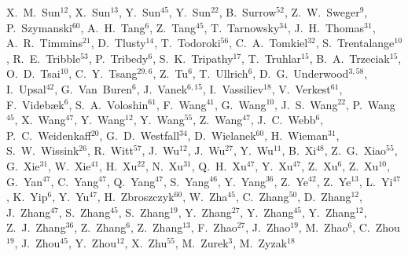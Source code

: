 {X.~M.~Sun$^{12}$,
X.~Sun$^{13}$,
Y.~Sun$^{45}$,
Y.~Sun$^{22}$,
B.~Surrow$^{52}$,
Z.~W.~Sweger$^{9}$,
P.~Szymanski$^{60}$,
A.~H.~Tang$^{6}$,
Z.~Tang$^{45}$,
T.~Tarnowsky$^{34}$,
J.~H.~Thomas$^{31}$,
A.~R.~Timmins$^{21}$,
D.~Tlusty$^{14}$,
T.~Todoroki$^{56}$,
C.~A.~Tomkiel$^{32}$,
S.~Trentalange$^{10}$,
R.~E.~Tribble$^{53}$,
P.~Tribedy$^{6}$,
S.~K.~Tripathy$^{17}$,
T.~Truhlar$^{15}$,
B.~A.~Trzeciak$^{15}$,
O.~D.~Tsai$^{10}$,
C.~Y.~Tsang$^{29,6}$,
Z.~Tu$^{6}$,
T.~Ullrich$^{6}$,
D.~G.~Underwood$^{3,58}$,
I.~Upsal$^{42}$,
G.~Van~Buren$^{6}$,
J.~Vanek$^{6,15}$,
I.~Vassiliev$^{18}$,
V.~Verkest$^{61}$,
F.~Videb{\ae}k$^{6}$,
S.~A.~Voloshin$^{61}$,
F.~Wang$^{41}$,
G.~Wang$^{10}$,
J.~S.~Wang$^{22}$,
P.~Wang$^{45}$,
X.~Wang$^{47}$,
Y.~Wang$^{12}$,
Y.~Wang$^{55}$,
Z.~Wang$^{47}$,
J.~C.~Webb$^{6}$,
P.~C.~Weidenkaff$^{20}$,
G.~D.~Westfall$^{34}$,
D.~Wielanek$^{60}$,
H.~Wieman$^{31}$,
S.~W.~Wissink$^{26}$,
R.~Witt$^{57}$,
J.~Wu$^{12}$,
J.~Wu$^{27}$,
Y.~Wu$^{11}$,
B.~Xi$^{48}$,
Z.~G.~Xiao$^{55}$,
G.~Xie$^{31}$,
W.~Xie$^{41}$,
H.~Xu$^{22}$,
N.~Xu$^{31}$,
Q.~H.~Xu$^{47}$,
Y.~Xu$^{47}$,
Z.~Xu$^{6}$,
Z.~Xu$^{10}$,
G.~Yan$^{47}$,
C.~Yang$^{47}$,
Q.~Yang$^{47}$,
S.~Yang$^{46}$,
Y.~Yang$^{36}$,
Z.~Ye$^{42}$,
Z.~Ye$^{13}$,
L.~Yi$^{47}$,
K.~Yip$^{6}$,
Y.~Yu$^{47}$,
H.~Zbroszczyk$^{60}$,
W.~Zha$^{45}$,
C.~Zhang$^{50}$,
D.~Zhang$^{12}$,
J.~Zhang$^{47}$,
S.~Zhang$^{45}$,
S.~Zhang$^{19}$,
Y.~Zhang$^{27}$,
Y.~Zhang$^{45}$,
Y.~Zhang$^{12}$,
Z.~J.~Zhang$^{36}$,
Z.~Zhang$^{6}$,
Z.~Zhang$^{13}$,
F.~Zhao$^{27}$,
J.~Zhao$^{19}$,
M.~Zhao$^{6}$,
C.~Zhou$^{19}$,
J.~Zhou$^{45}$,
Y.~Zhou$^{12}$,
X.~Zhu$^{55}$,
M.~Zurek$^{3}$,
M.~Zyzak$^{18}$
}

\address{\rm{(STAR Collaboration)}}

